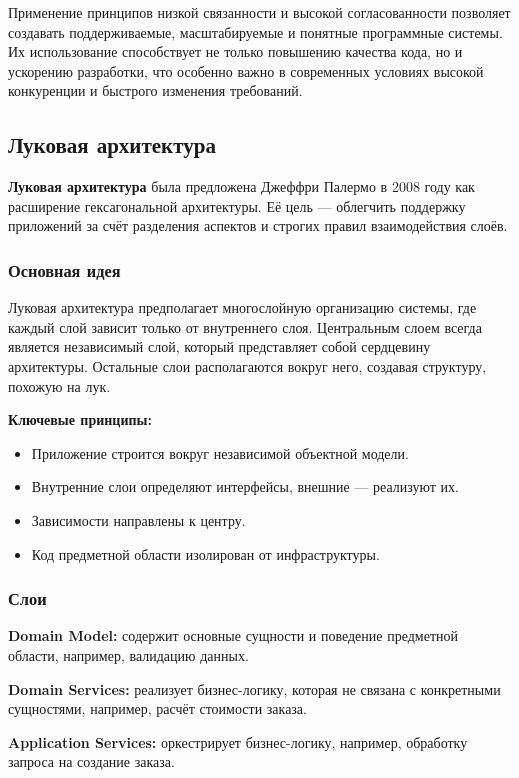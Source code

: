 Применение принципов низкой связанности и высокой согласованности позволяет создавать поддерживаемые, масштабируемые и понятные программные системы. Их использование способствует не только повышению качества кода, но и ускорению разработки, что особенно важно в современных условиях высокой конкуренции и быстрого изменения требований.





\subsection{Луковая архитектура}
\textbf{Луковая архитектура} была предложена Джеффри Палермо в 2008 году как расширение гексагональной архитектуры\cite{palermo2008onion}. Её цель — облегчить поддержку приложений за счёт разделения аспектов и строгих правил взаимодействия слоёв.

\subsubsection{Основная идея}
Луковая архитектура предполагает многослойную организацию системы, где каждый слой зависит только от внутреннего слоя. Центральным слоем всегда является независимый слой, который представляет собой сердцевину архитектуры. Остальные слои располагаются вокруг него, создавая структуру, похожую на лук.

\textbf{Ключевые принципы:}
\begin{itemize}
    \item Приложение строится вокруг независимой объектной модели.
    \item Внутренние слои определяют интерфейсы, внешние — реализуют их.
    \item Зависимости направлены к центру.
    \item Код предметной области изолирован от инфраструктуры.
\end{itemize}

\subsubsection{Слои}
\textbf{Domain Model:} содержит основные сущности и поведение предметной области, например, валидацию данных.

\textbf{Domain Services:} реализует бизнес-логику, которая не связана с конкретными сущностями, например, расчёт стоимости заказа.

\textbf{Application Services:} оркестрирует бизнес-логику, например, обработку запроса на создание заказа.

